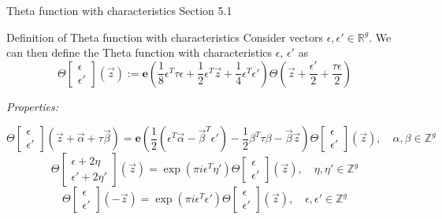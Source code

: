 \documentclass[11pt,aspectratio=169]{beamer}
\newcommand{\ee}[0]{\mathbf{e}}
\begin{document}
\begin{frame}[noframenumbering]{Theta function with characteristics}{\tiny \cite{Ber06} Section 5.1}
    \begin{block}{Definition of Theta function with characteristics}
        Consider vectors $ \epsilon ,  \epsilon' \in \mathbb R^g$.
        We can then define the Theta function with characteristics $ \epsilon$, $ \epsilon'$ as
        \[\Theta\begin{bmatrix} \epsilon \\  \epsilon'\end{bmatrix}(\vec z) := 
        \ee\left(\frac{1}{8}\epsilon^T \tau \epsilon + \frac{1}{2}\epsilon^T \vec z + \frac{1}{4}\epsilon^T  \epsilon'\right)
        \Theta\left(\vec z + \frac{\epsilon'}{2}+\frac{\tau\epsilon}{2}\right)\] 
    \end{block}

    \emph{Properties:}

    \[\Theta\begin{bmatrix}\epsilon \\ \epsilon'\end{bmatrix}(\vec z + \vec \alpha + \tau \vec \beta) =
    \ee\left(\frac{1}{2}(\epsilon^T \vec \alpha - \vec \beta^T \epsilon') - \frac{1}{2} \beta^T \tau \beta - \vec \beta \vec z\right)
    \Theta\begin{bmatrix}\epsilon \\ \epsilon'\end{bmatrix}(\vec z), \quad \alpha,\beta \in \mathbb Z^g\]
    \[\Theta\begin{bmatrix}\epsilon + 2\eta \\ \epsilon' + 2\eta' \end{bmatrix}(\vec z) = \exp(\pi i \epsilon^T \eta')
    \Theta\begin{bmatrix}\epsilon \\ \epsilon'\end{bmatrix}(\vec z) , \quad \eta,\eta' \in \mathbb Z^g\]
    \[\Theta\begin{bmatrix}\epsilon \\ \epsilon'\end{bmatrix}(-\vec z) = \exp(\pi i \epsilon^T \epsilon') \Theta\begin{bmatrix}\epsilon \\ \epsilon'\end{bmatrix}(\vec z) , \quad \epsilon,\epsilon' \in \mathbb Z^g\]
\end{frame}
\end{document}
